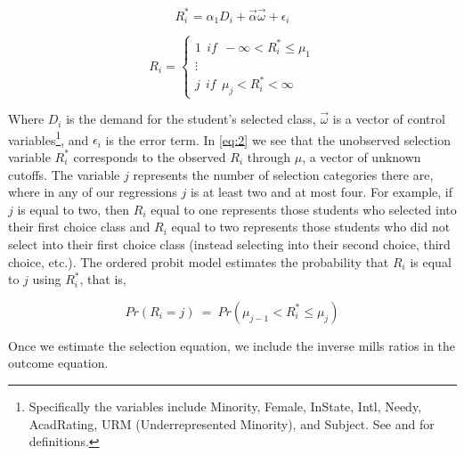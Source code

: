 \begin{equation}\label{eq:1}
R_{i}^{*} = \alpha_{1} D_{i} + \overrightarrow{\alpha} \overrightarrow{\omega} + \epsilon_{i}
\end{equation}

\setlength{\belowdisplayskip}{11pt} \setlength{\belowdisplayshortskip}{1pt}
\setlength{\abovedisplayskip}{-4pt} \setlength{\abovedisplayshortskip}{1pt}

\begin{equation}\label{eq:2}
R_{i} = 
\begin{cases}
  1 \ \ if \ \ - \infty < R_{i}^{*} \leq \mu_{1} \\
  \vdots \\
  j \ \ if \ \ \mu_{j} < R_{i}^{*} < \infty
\end{cases}
\end{equation}

Where $D_{i}$ is the demand for the student's selected class, $\overrightarrow{\omega}$ is a vector of control variables\footnote{Specifically the variables include Minority, Female, InState, Intl, Needy, AcadRating, URM (Underrepresented Minority), and Subject. See  and  for definitions.}, and $\epsilon_{i}$ is the error term. 
In \eqref{eq:2} we see that the unobserved selection variable $R_{i}^{*}$ corresponds to the observed $R_{i}$ through $\mu$, a vector of unknown cutoffs. 
The variable $j$ represents the number of selection categories there are, where in any of our regressions $j$ is at least two and at most four. 
For example, if $j$ is equal to two, then $R_{i}$ equal to one represents those students who selected into their first choice class and $R_{i}$ equal to two represents those students who did not select into their first choice class (instead selecting into their second choice, third choice, etc.). 
The ordered probit model estimates the probability that $R_{i}$ is equal to $j$ using $R_{i}^{*}$, that is, 

\setlength{\belowdisplayskip}{5pt} \setlength{\belowdisplayshortskip}{1pt}
\setlength{\abovedisplayskip}{-4pt} \setlength{\abovedisplayshortskip}{1pt}

\begin{equation}\label{eq:3}
Pr(R_{i} = j) \ = \ Pr(\mu_{j-1} < R_{i}^{*} \leq \mu_{j})
\end{equation}

\noindent Once we estimate the selection equation, we include the inverse mills ratios in the outcome equation.

